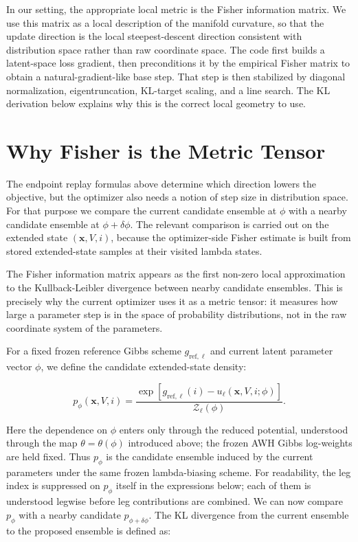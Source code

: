 In our setting, the appropriate local metric is the Fisher information matrix. We use this matrix as a local description of the manifold curvature, so that the update direction is the local steepest-descent direction consistent with distribution space rather than raw coordinate space. The code first builds a latent-space loss gradient, then preconditions it by the empirical Fisher matrix to obtain a natural-gradient-like base step. That step is then stabilized by diagonal normalization, eigentruncation, KL-target scaling, and a line search. The KL derivation below explains why this is the correct local geometry to use.

\section{Why Fisher is the Metric Tensor}

The endpoint replay formulas above determine which direction lowers the objective, but the optimizer also needs a notion of step size in distribution space. For that purpose we compare the current candidate ensemble at $\phi$ with a nearby candidate ensemble at $\phi + \delta \phi$. The relevant comparison is carried out on the extended state $(\mathbf{x}, V, i)$, because the optimizer-side Fisher estimate is built from stored extended-state samples at their visited lambda states.

The Fisher information matrix appears as the first non-zero local approximation to the Kullback-Leibler divergence between nearby candidate ensembles. This is precisely why the current optimizer uses it as a metric tensor: it measures how large a parameter step is in the space of probability distributions, not in the raw coordinate system of the parameters.

For a fixed frozen reference Gibbs scheme $g_{\mathrm{ref},\ell}$ and current latent parameter vector $\phi$, we define the candidate extended-state density:

\begin{equation}
    p_\phi(\mathbf{x}, V, i)
    =
    \frac{
        \exp \left[
            g_{\mathrm{ref},\ell}(i)
            -
            u_\ell(\mathbf{x}, V, i; \phi)
        \right]
    }{
        \mathcal{Z}_\ell(\phi)
    }.
    \label{eq:pphi}
\end{equation}

Here the dependence on $\phi$ enters only through the reduced potential, understood through the map $\theta = \theta(\phi)$ introduced above; the frozen AWH Gibbs log-weights are held fixed. Thus $p_\phi$ is the candidate ensemble induced by the current parameters under the same frozen lambda-biasing scheme. For readability, the leg index is suppressed on $p_\phi$ itself in the expressions below; each of them is understood legwise before leg contributions are combined. We can now compare $p_\phi$ with a nearby candidate $p_{\phi + \delta \phi}$. The KL divergence from the current ensemble to the proposed ensemble is defined as:

